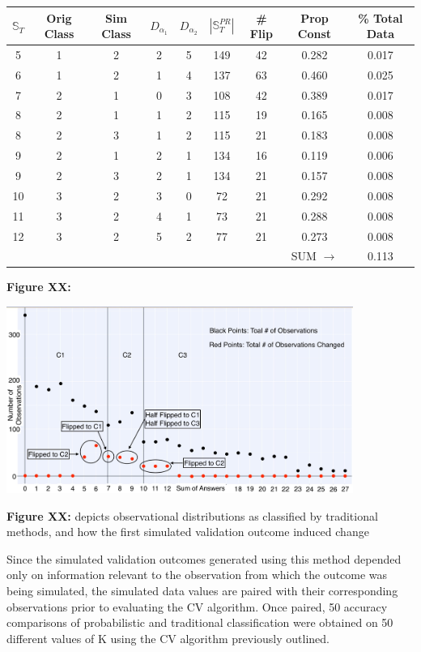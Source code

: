 \documentclass[12pt,]{article}
\begin{document}
\begin{center}
\begin{tabular}{|c|c|c|c|c|c|c|c|c|}
\hline
$\mathbb{S}_{T}$ & Orig Class & Sim Class & $D_{\alpha_{1}}$ & $D_{\alpha_{2}}$ & $|\mathbb{S}_{T}^{PR}|$ & \# Flip & Prop Const & \% Total Data \\
\hline
\hline
5 & 1 & 2 & 2 & 5 & 149 & 42 & 0.282 & 0.017 \\
\hline
6 & 1 & 2 & 1 & 4 & 137 & 63 & 0.460 & 0.025 \\
\hline
7 & 2 & 1 & 0 & 3 & 108 & 42 & 0.389 & 0.017 \\
\hline
8 & 2 & 1 & 1 & 2 & 115 & 19 & 0.165 & 0.008 \\
\hline
8 & 2 & 3 & 1 & 2 & 115 & 21 & 0.183 & 0.008 \\
\hline
9 & 2 & 1 & 2 & 1 & 134 & 16 & 0.119 & 0.006 \\
\hline
9 & 2 & 3 & 2 & 1 & 134 & 21 & 0.157 & 0.008 \\
\hline
10 & 3 & 2 & 3 & 0 & 72 & 21 & 0.292 & 0.008 \\
\hline
11 & 3 & 2 & 4 & 1 & 73 & 21 & 0.288 & 0.008 \\
\hline
12 & 3 & 2 & 5 & 2 & 77 & 21 & 0.273 & 0.008 \\
\hline
 &  &  &  &  &  &  & SUM $\rightarrow$ & 0.113 \\
\hline
\end{tabular}
\end{center}

\textbf{Figure XX:}

\begin{center}
\includegraphics[width=0.85\textwidth]{ClassFlips.jpeg}
\end{center}

\textbf{Figure XX:} depicts observational distributions as classified by
traditional methods, and how the first simulated validation outcome
induced change

Since the simulated validation outcomes generated using this method
depended only on information relevant to the observation from which the
outcome was being simulated, the simulated data values are paired with
their corresponding observations prior to evaluating the CV algorithm.
Once paired, 50 accuracy comparisons of probabilistic and traditional
classification were obtained on 50 different values of K using the CV
algorithm previously outlined.
\end{document}
